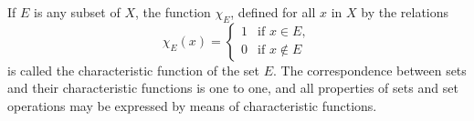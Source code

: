 If $E$ is any subset of $X$, the function $\chi_E$, defined for all $x$ in $X$ by the relations
$$\chi_E(x) = \begin{cases} 1 & \text{if } x \in E, \\ 0 & \text{if } x \not\in E \end{cases}$$
is called the characteristic function of the set $E$. The correspondence between sets and their characteristic functions is one to one, and all properties of sets and set operations may be expressed by means of characteristic functions.

